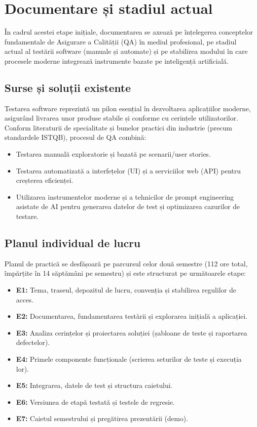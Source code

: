 \chapter{Documentare și stadiul actual}

În cadrul acestei etape inițiale, documentarea se axează pe înțelegerea conceptelor fundamentale de Asigurare a Calității (QA) în mediul profesional, pe stadiul actual al testării software (manuale și automate) și pe stabilirea modului în care procesele moderne integrează instrumente bazate pe inteligență artificială.

\section{Surse și soluții existente}
Testarea software reprezintă un pilon esențial în dezvoltarea aplicațiilor moderne, asigurând livrarea unor produse stabile și conforme cu cerințele utilizatorilor. Conform literaturii de specialitate și bunelor practici din industrie (precum standardele ISTQB), procesul de QA combină:
\begin{itemize}
    \item Testarea manuală exploratorie și bazată pe scenarii/user stories.
    \item Testarea automatizată a interfețelor (UI) și a serviciilor web (API) pentru creșterea eficienței.
    \item Utilizarea instrumentelor moderne și a tehnicilor de prompt engineering asistate de AI pentru generarea datelor de test și optimizarea cazurilor de testare.
\end{itemize}

\section{Planul individual de lucru}
Planul de practică se desfășoară pe parcursul celor două semestre (112 ore total, împărțite în 14 săptămâni pe semestru) și este structurat pe următoarele etape:
\begin{itemize}
    \item \textbf{E1:} Tema, traseul, depozitul de lucru, convenția și stabilirea regulilor de acces.
    \item \textbf{E2:} Documentarea, fundamentarea testării și explorarea inițială a aplicației.
    \item \textbf{E3:} Analiza cerințelor și proiectarea soluției (șabloane de teste și raportarea defectelor).
    \item \textbf{E4:} Primele componente funcționale (scrierea seturilor de teste și execuția lor).
    \item \textbf{E5:} Integrarea, datele de test și structura caietului.
    \item \textbf{E6:} Versiunea de etapă testată și testele de regresie.
    \item \textbf{E7:} Caietul semestrului și pregătirea prezentării (demo).
\end{itemize}